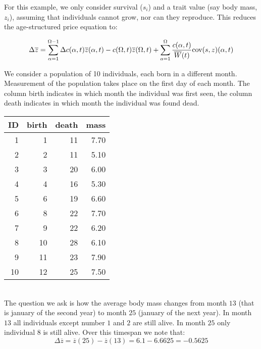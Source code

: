 For this example, we only consider survival ($s_i$) and a trait value (say body mass, $z_i$), assuming that individuals cannot grow, nor can they reproduce. This reduces the age-structured price equation to:

\begin{equation}
\Delta \overline{z} = \sum_{\alpha=1}^{\Omega-1} \Delta c(\alpha,t)\overline{z}(\alpha,t) - c(\Omega,t) \overline{z}(\Omega,t) + \sum_{a=1}^{\Omega} \frac{c(\alpha,t)}{\overline{W}(t)} \text{cov}(s,z)(\alpha,t)
\end{equation}

We consider a population of 10 individuals, each born in a different month. Measurement of the population takes place on the first day of each month. The column birth indicates in which month the individual was first seen, the column death indicates in which month the individual was found dead. \\
\begin{tabular}{rrrr}
  \hline
ID & birth & death & mass \\ 
  \hline
1 &   1 &  11 & 7.70 \\ 
  2 &   2 &  11 & 5.10 \\ 
  3 &   3 &  20 & 6.00 \\ 
  4 &   4 &  16 & 5.30 \\ 
  5 &   6 &  19 & 6.60 \\ 
  6 &   8 &  22 & 7.70 \\ 
  7 &   9 &  22 & 6.20 \\ 
  8 &  10 &  28 & 6.10 \\ 
  9 &  11 &  23 & 7.90 \\ 
  10 &  12 &  25 & 7.50 \\ 
   \hline
\end{tabular} \\
The question we ask is how the average body mass changes from month $13$ (that is january of the second year) to month $25$ (january of the next year). In month $13$ all individuals except number $1$ and $2$ are still alive. In month $25$ only individual $8$ is still alive. Over this timespan we note that:
\begin{equation}
\Delta \overline{z} = \overline{z}(25) - \overline{z}(13) = 6.1 - 6.6625 = - 0.5625
\end{equation}

